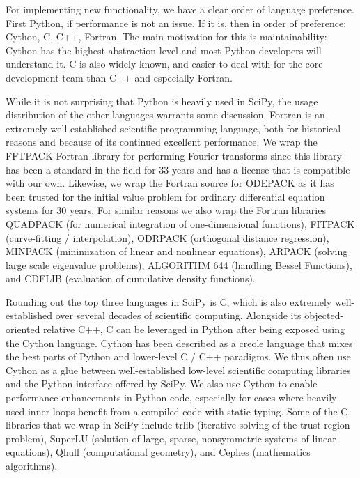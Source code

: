 \documentclass[fleqn,10pt]{wlscirep}
\begin{document}
For implementing new functionality, we have a clear order of language preference.
First Python, if performance is not an issue. If it is, then in order of
preference: Cython, C, C++, Fortran. The main motivation for this is 
maintainability: Cython has the highest abstraction level and most 
Python developers will understand it. C is also widely known,
and easier to deal with for the core development team
than C++ and especially Fortran.

While it is not surprising that Python is heavily used in SciPy, the
usage distribution of the other languages warrants some discussion. Fortran
is an extremely well-established scientific programming language, both
for historical reasons and because of its continued excellent
performance\cite{Koelbel:1993:HPF:562354}. We
wrap the FFTPACK Fortran library for performing Fourier
transforms\cite{SWARZTRAUBER198445, SWARZTRAUBER198251} since
this library has been a standard in the field for 33 years and has a license
that is compatible with our own. Likewise, we wrap the Fortran source
for ODEPACK\cite{citeulike:2644528} as it has been  trusted for the initial 
value problem for ordinary differential equation systems for 30 years. For
similar reasons we also wrap the Fortran libraries QUADPACK\cite{1983qspa.book.....P} (for numerical
integration of one-dimensional functions), FITPACK\cite{Dierckx:1993:CSF:151103} (curve-fitting /
interpolation), ODRPACK\cite{ODRPACK_Boggs} (orthogonal distance regression),
MINPACK\cite{osti_6997568} (minimization of linear and nonlinear equations),
ARPACK\cite{leh:sor:yan96} (solving large scale eigenvalue problems), 
ALGORITHM 644\cite{Amos:1986:APP:7921.214331} (handling Bessel Functions), and 
CDFLIB\cite{CDFLIB_site} (evaluation of cumulative density functions).

Rounding out the top three languages in SciPy is C, which is also extremely
well-established over several decades\cite{Kernighan:1988:CPL:576122} of
scientific computing. Alongside its objected-oriented relative C++, C
can be leveraged in Python after being exposed using the Cython
language. Cython has been described as a creole language that mixes
the best parts of Python and lower-level C / C++
paradigms\cite{behnel2011cython}. We thus often use Cython as a glue
between well-established low-level scientific computing libraries and
the Python interface offered by SciPy. We also use Cython to enable
performance enhancements in Python code, especially for cases where heavily
used inner loops benefit from a compiled code with static typing. Some of the C
libraries that we wrap in SciPy include trlib\cite{doi:10.1080/10556788.2018.1449842} 
(iterative solving of the trust region problem), SuperLU\cite{li05,superlu_ug99} (solution of
large, sparse, nonsymmetric systems of linear equations),
Qhull\cite{Barber:1996:QAC:235815.235821} (computational
geometry), and Cephes\cite{cephes_netlib} (mathematics algorithms). 
\end{document}
